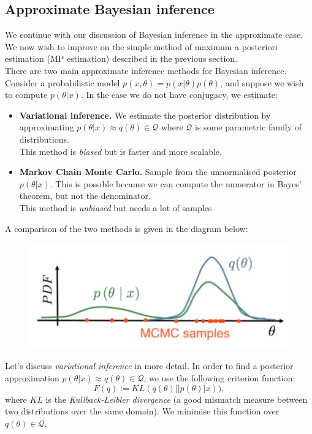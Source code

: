 \newpage
\subsection{Approximate Bayesian inference}
We continue with our discussion of Bayesian inference in the approximate case. We now wish to improve on the simple method of maximum a posteriori estimation (MP estimation) described in the previous section.\\

There are two main approximate inference methods for Bayesian inference. Consider a probabilistic model $p(x,\theta) = p(x| \theta)p(\theta)$, and suppose we wish to compute $p(\theta | x)$. In the case we do not have conjugacy, we estimate:
\begin{itemize}
\item \textbf{Variational inference.} We estimate the posterior distribution by approximating $p(\theta | x) \approx q(\theta) \in \mathcal{Q}$ where $\mathcal{Q}$ is some parametric family of distributions.\\

This method is \textit{biased} but is faster and more scalable.
\item \textbf{Markov Chain Monte Carlo.} Sample from the unnormalised posterior $p(\theta | x)$. This is possible because we can compute the numerator in Bayes' theorem, but not the denominator.\\

This method is \textit{unbiased} but needs a lot of samples.
\end{itemize}
A comparison of the two methods is given in the diagram below:
\begin{figure}[H]
\centering
\includegraphics[scale=0.4]{variationalmcmc.png}
\end{figure}


\minirule

Let's discuss \textit{variational inference} in more detail. In order to find a posterior approximation $p(\theta | x) \approx q(\theta) \in \mathcal{Q}$, we use the following criterion function:
\begin{equation*}
F(q) := KL(q(\theta) || p(\theta) | x)),
\end{equation*}
where $KL$ is the \textit{Kullback-Leibler divergence} (a good mismatch measure between two distributions over the same domain). We minimise this function over $q(\theta) \in \mathcal{Q}$.\\

